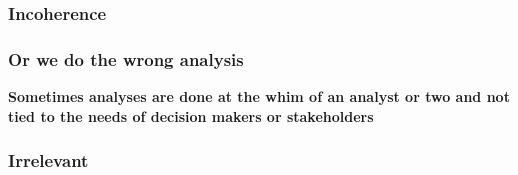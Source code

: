 \documentclass[12pt,handout]{beamer}
\begin{document}
{
\begin{frame}[plain]
\frametitle{Incoherence}
\end{frame}
}

\begin{frame}
\frametitle{Or we do the wrong analysis}
\begin{center}
\Large \textbf{Sometimes analyses are done at the whim of an analyst or two and not tied to the needs of decision makers or stakeholders}
\end{center}
\end{frame}

{
\begin{frame}[plain]
\frametitle{Irrelevant}
\end{frame}
}
\end{document}
